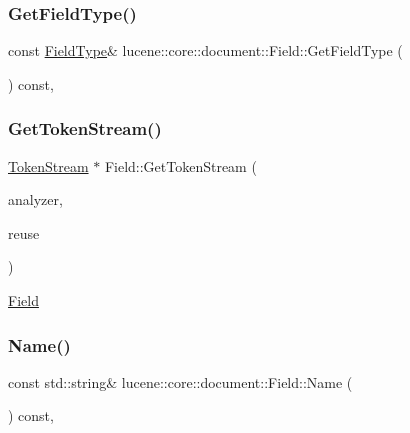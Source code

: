 \subsubsection{\texorpdfstring{Get\+Field\+Type()}{GetFieldType()}}
{\footnotesize\ttfamily const \mbox{\hyperlink{classlucene_1_1core_1_1document_1_1FieldType}{Field\+Type}}\& lucene\+::core\+::document\+::\+Field\+::\+Get\+Field\+Type (\begin{DoxyParamCaption}{ }\end{DoxyParamCaption}) const\hspace{0.3cm}{\ttfamily [inline]}, {\ttfamily [noexcept]}}

\mbox{\label{classlucene_1_1core_1_1document_1_1Field_aa3d6b7ab7cb42820491c036872190317}} 
\subsubsection{\texorpdfstring{Get\+Token\+Stream()}{GetTokenStream()}}
{\footnotesize\ttfamily \mbox{\hyperlink{classlucene_1_1core_1_1analysis_1_1TokenStream}{Token\+Stream}} $\ast$ Field\+::\+Get\+Token\+Stream (\begin{DoxyParamCaption}\item[{\mbox{\hyperlink{classlucene_1_1core_1_1analysis_1_1Analyzer}{lucene\+::core\+::analysis\+::\+Analyzer}} \&}]{analyzer,  }\item[{\mbox{\hyperlink{classlucene_1_1core_1_1analysis_1_1TokenStream}{lucene\+::core\+::analysis\+::\+Token\+Stream}} \&}]{reuse }\end{DoxyParamCaption})\hspace{0.3cm}{\ttfamily [virtual]}}

\mbox{\hyperlink{classlucene_1_1core_1_1document_1_1Field}{Field}} \mbox{\label{classlucene_1_1core_1_1document_1_1Field_a9b6d39e8c30c59bfe0556c38beeeb06e}} 
\subsubsection{\texorpdfstring{Name()}{Name()}}
{\footnotesize\ttfamily const std\+::string\& lucene\+::core\+::document\+::\+Field\+::\+Name (\begin{DoxyParamCaption}{ }\end{DoxyParamCaption}) const\hspace{0.3cm}{\ttfamily [inline]}, {\ttfamily [noexcept]}}

